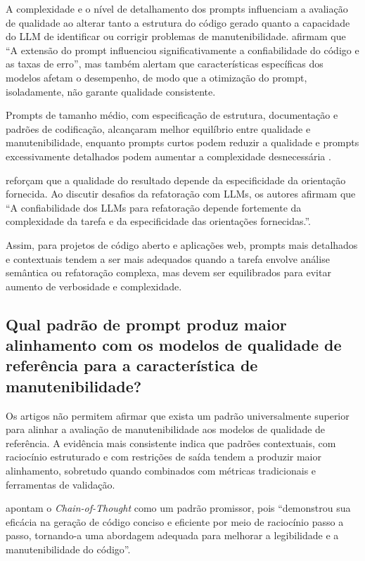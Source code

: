 A complexidade e o nível de detalhamento dos prompts influenciam a avaliação de qualidade ao alterar tanto a estrutura do código gerado quanto a capacidade do LLM de identificar ou corrigir problemas de manutenibilidade.  afirmam que “A extensão do prompt influenciou significativamente a confiabilidade do código e as taxas de erro”, mas também alertam que características específicas dos modelos afetam o desempenho, de modo que a otimização do prompt, isoladamente, não garante qualidade consistente. 

Prompts de tamanho médio, com especificação de estrutura, documentação e padrões de codificação, alcançaram melhor equilíbrio entre qualidade e manutenibilidade, enquanto prompts curtos podem reduzir a qualidade e prompts excessivamente detalhados podem aumentar a complexidade desnecessária \cite{KrebsEtAll}.

 reforçam que a qualidade do resultado depende da especificidade da orientação fornecida. Ao discutir desafios da refatoração com LLMs, os autores afirmam que “A confiabilidade dos LLMs para refatoração depende fortemente da complexidade da tarefa e da especificidade das orientações fornecidas.”.

Assim, para projetos de código aberto e aplicações web, prompts mais detalhados e contextuais tendem a ser mais adequados quando a tarefa envolve análise semântica ou refatoração complexa, mas devem ser equilibrados para evitar aumento de verbosidade e complexidade.

\subsection{Qual padrão de prompt produz maior alinhamento com os modelos de qualidade de referência para a característica de manutenibilidade?}

Os artigos não permitem afirmar que exista um padrão universalmente superior para alinhar a avaliação de manutenibilidade aos modelos de qualidade de referência. A evidência mais consistente indica que padrões contextuais, com raciocínio estruturado e com restrições de saída tendem a produzir maior alinhamento, sobretudo quando combinados com métricas tradicionais e ferramentas de validação. 

 apontam o \textit{Chain-of-Thought} como um padrão promissor, pois ``demonstrou sua eficácia na geração de código conciso e eficiente por meio de raciocínio passo a passo, tornando-a uma abordagem adequada para melhorar a legibilidade e a manutenibilidade do código''.

